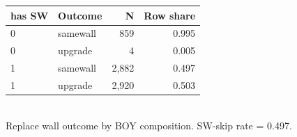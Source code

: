 \begin{table}[ht]
\centering
\small
\renewcommand{\arraystretch}{1.15}
\begin{tabular}{llrr}
\hline
has SW & Outcome & N & Row share \\
\hline
0 & samewall &   859 & 0.995 \\
0 & upgrade &     4 & 0.005 \\
1 & samewall & 2,882 & 0.497 \\
1 & upgrade & 2,920 & 0.503 \\
\hline
\end{tabular}
\\[2pt]{\footnotesize Replace wall outcome by BOY composition. SW-skip rate = 0.497.}
\end{table}

